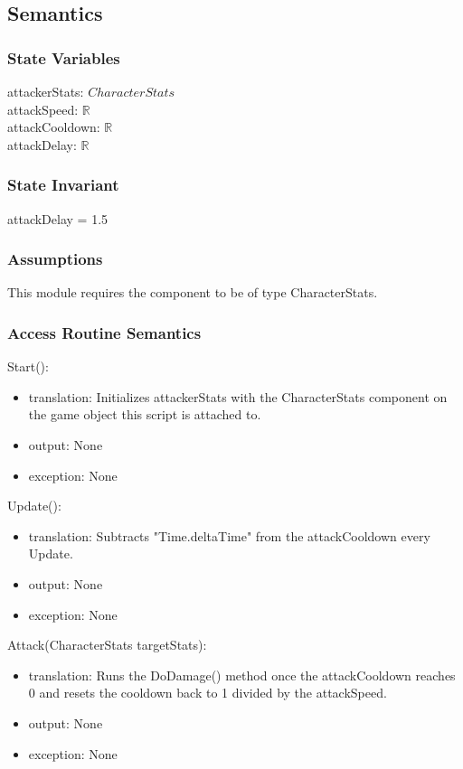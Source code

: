 \documentclass[12pt]{article}
\begin{document}
\subsection* {Semantics}

\subsubsection* {State Variables}

attackerStats: $CharacterStats$\\
attackSpeed: $\mathbb{R}$ \\
attackCooldown: $\mathbb{R}$ \\
attackDelay: $\mathbb{R}$ \\

\subsubsection* {State Invariant}

attackDelay = 1.5

\subsubsection* {Assumptions}

This module requires the component to be of type CharacterStats. 

\subsubsection* {Access Routine Semantics}

\noindent Start():
\begin{itemize}
\item translation: Initializes attackerStats with the CharacterStats component on the game object this script is attached to.
\item output: None
\item exception: None
\end{itemize}

\noindent Update():
\begin{itemize}
\item translation: Subtracts "Time.deltaTime" from the attackCooldown every Update.
\item output: None
\item exception: None
\end{itemize}

\noindent Attack(CharacterStats targetStats):
\begin{itemize}
\item translation: Runs the DoDamage() method once the attackCooldown reaches 0 and resets the cooldown back to 1 divided by the attackSpeed.
\item output: None
\item exception: None
\end{itemize}
\end{document}
